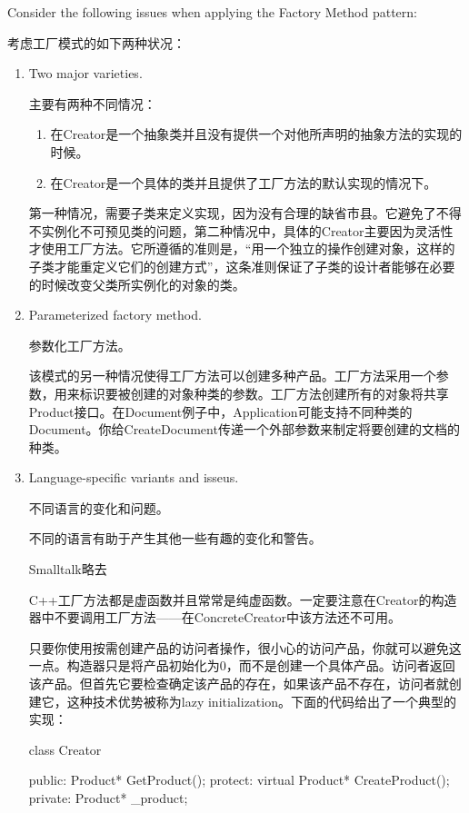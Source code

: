 Consider the following issues when applying the Factory Method pattern:

考虑工厂模式的如下两种状况：

\begin{enumerate}
	\item Two major varieties.

		  主要有两种不同情况：

		  \begin{enumerate}
		  		\item 在Creator是一个抽象类并且没有提供一个对他所声明的抽象方法的实现的时候。

				\item 在Creator是一个具体的类并且提供了工厂方法的默认实现的情况下。
		  \end{enumerate}

   		  第一种情况，需要子类来定义实现，因为没有合理的缺省市县。它避免了不得不实例化不可预见类的问题，第二种情况中，具体的Creator主要因为灵活性才使用工厂方法。它所遵循的准则是，“用一个独立的操作创建对象，这样的子类才能重定义它们的创建方式”，这条准则保证了子类的设计者能够在必要的时候改变父类所实例化的对象的类。

	\item Parameterized factory method.
		  
		  参数化工厂方法。

		  该模式的另一种情况使得工厂方法可以创建多种产品。工厂方法采用一个参数，用来标识要被创建的对象种类的参数。工厂方法创建所有的对象将共享Product接口。在Document例子中，Application可能支持不同种类的Document。你给CreateDocument传递一个外部参数来制定将要创建的文档的种类。

	\item Language-specific variants and isseus.

	      不同语言的变化和问题。

		  不同的语言有助于产生其他一些有趣的变化和警告。

		  Smalltalk略去

		  C++工厂方法都是虚函数并且常常是纯虚函数。一定要注意在Creator的构造器中不要调用工厂方法——在ConcreteCreator中该方法还不可用。

		  只要你使用按需创建产品的访问者操作，很小心的访问产品，你就可以避免这一点。构造器只是将产品初始化为0，而不是创建一个具体产品。访问者返回该产品。但首先它要检查确定该产品的存在，如果该产品不存在，访问者就创建它，这种技术优势被称为lazy initialization。下面的代码给出了一个典型的实现：

\begin{schemedisplay}
class Creator{
	public:
		Product* GetProduct();
	protect:
		virtual Product* CreateProduct();
	private:
		Product* _product;
		  	
}
\end{schemedisplay}
\end{enumerate}

